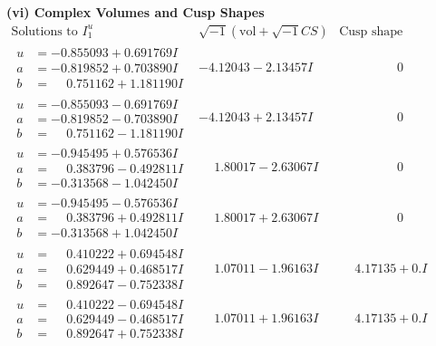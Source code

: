 \documentclass[1p]{elsarticle_modified}
\theoremstyle{definition}
\newcommand{\I}{\sqrt{-1}}
\begin{document}
\newpage\flushleft \textbf{(vi) Complex Volumes and Cusp Shapes}
$$\begin{array}{c|c|c}  
\text{Solutions to }I^u_{1}& \I (\text{vol} + \sqrt{-1}CS) & \text{Cusp shape}\\
 \hline 
\begin{aligned}
u &= -0.855093 + 0.691769 I \\
a &= -0.819852 + 0.703890 I \\
b &= \phantom{-}0.751162 + 1.181190 I\end{aligned}
 & -4.12043 - 2.13457 I & \phantom{-0.000000 } 0 \\ \hline\begin{aligned}
u &= -0.855093 - 0.691769 I \\
a &= -0.819852 - 0.703890 I \\
b &= \phantom{-}0.751162 - 1.181190 I\end{aligned}
 & -4.12043 + 2.13457 I & \phantom{-0.000000 } 0 \\ \hline\begin{aligned}
u &= -0.945495 + 0.576536 I \\
a &= \phantom{-}0.383796 - 0.492811 I \\
b &= -0.313568 - 1.042450 I\end{aligned}
 & \phantom{-}1.80017 - 2.63067 I & \phantom{-0.000000 } 0 \\ \hline\begin{aligned}
u &= -0.945495 - 0.576536 I \\
a &= \phantom{-}0.383796 + 0.492811 I \\
b &= -0.313568 + 1.042450 I\end{aligned}
 & \phantom{-}1.80017 + 2.63067 I & \phantom{-0.000000 } 0 \\ \hline\begin{aligned}
u &= \phantom{-}0.410222 + 0.694548 I \\
a &= \phantom{-}0.629449 + 0.468517 I \\
b &= \phantom{-}0.892647 - 0.752338 I\end{aligned}
 & \phantom{-}1.07011 - 1.96163 I & \phantom{-}4.17135 + 0. I\phantom{ +0.000000I} \\ \hline\begin{aligned}
u &= \phantom{-}0.410222 - 0.694548 I \\
a &= \phantom{-}0.629449 - 0.468517 I \\
b &= \phantom{-}0.892647 + 0.752338 I\end{aligned}
 & \phantom{-}1.07011 + 1.96163 I & \phantom{-}4.17135 + 0. I\phantom{ +0.000000I} \\ \hline\begin{aligned}

\end{aligned}
\end{array}$$
\end{document}
